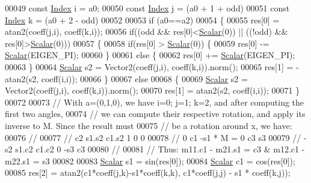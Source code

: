 \begin{DoxyCode}
00049   \textcolor{keyword}{const} \hyperlink{namespace_eigen_a62e77e0933482dafde8fe197d9a2cfde}{Index} i = a0;
00050   \textcolor{keyword}{const} \hyperlink{namespace_eigen_a62e77e0933482dafde8fe197d9a2cfde}{Index} j = (a0 + 1 + odd)%
00051   \textcolor{keyword}{const} \hyperlink{namespace_eigen_a62e77e0933482dafde8fe197d9a2cfde}{Index} k = (a0 + 2 - odd)%
00052   
00053   \textcolor{keywordflow}{if} (a0==a2)
00054   \{
00055     res[0] = atan2(coeff(j,i), coeff(k,i));
00056     \textcolor{keywordflow}{if}((odd && res[0]<\hyperlink{group___core___module_a5feed465b3a8e60c47e73ecce83e39a2}{Scalar}(0)) || ((!odd) && res[0]>\hyperlink{group___core___module_a5feed465b3a8e60c47e73ecce83e39a2}{Scalar}(0)))
00057     \{
00058       \textcolor{keywordflow}{if}(res[0] > \hyperlink{group___core___module_a5feed465b3a8e60c47e73ecce83e39a2}{Scalar}(0)) \{
00059         res[0] -= \hyperlink{group___core___module_a5feed465b3a8e60c47e73ecce83e39a2}{Scalar}(EIGEN\_PI);
00060       \}
00061       \textcolor{keywordflow}{else} \{
00062         res[0] += \hyperlink{group___core___module_a5feed465b3a8e60c47e73ecce83e39a2}{Scalar}(EIGEN\_PI);
00063       \}
00064       \hyperlink{group___core___module_a5feed465b3a8e60c47e73ecce83e39a2}{Scalar} s2 = Vector2(coeff(j,i), coeff(k,i)).norm();
00065       res[1] = -atan2(s2, coeff(i,i));
00066     \}
00067     \textcolor{keywordflow}{else}
00068     \{
00069       \hyperlink{group___core___module_a5feed465b3a8e60c47e73ecce83e39a2}{Scalar} s2 = Vector2(coeff(j,i), coeff(k,i)).norm();
00070       res[1] = atan2(s2, coeff(i,i));
00071     \}
00072     
00073     \textcolor{comment}{// With a=(0,1,0), we have i=0; j=1; k=2, and after computing the first two angles,}
00074     \textcolor{comment}{// we can compute their respective rotation, and apply its inverse to M. Since the result must}
00075     \textcolor{comment}{// be a rotation around x, we have:}
00076     \textcolor{comment}{//}
00077     \textcolor{comment}{//  c2  s1.s2 c1.s2                   1  0   0 }
00078     \textcolor{comment}{//  0   c1    -s1       *    M    =   0  c3  s3}
00079     \textcolor{comment}{//  -s2 s1.c2 c1.c2                   0 -s3  c3}
00080     \textcolor{comment}{//}
00081     \textcolor{comment}{//  Thus:  m11.c1 - m21.s1 = c3  &   m12.c1 - m22.s1 = s3}
00082     
00083     \hyperlink{group___core___module_a5feed465b3a8e60c47e73ecce83e39a2}{Scalar} s1 = sin(res[0]);
00084     \hyperlink{group___core___module_a5feed465b3a8e60c47e73ecce83e39a2}{Scalar} c1 = cos(res[0]);
00085     res[2] = atan2(c1*coeff(j,k)-s1*coeff(k,k), c1*coeff(j,j) - s1 * coeff(k,j));

\end{DoxyCode}
